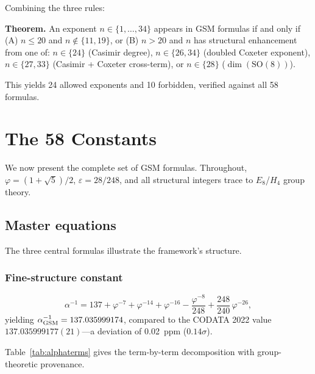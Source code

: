 \documentclass[aps,prd,twocolumn,superscriptaddress,nofootinbib,showpacs]{revtex4-2}
\begin{document}
Combining the three rules:

\textbf{Theorem.} An exponent $n \in \{1,\ldots,34\}$ appears in GSM
formulas if and only if (A) $n \leq 20$ and $n \notin \{11, 19\}$, or
(B) $n > 20$ and $n$ has structural enhancement from one of:
$n \in \{24\}$ (Casimir degree), $n \in \{26, 34\}$ (doubled Coxeter
exponent), $n \in \{27, 33\}$ (Casimir + Coxeter cross-term), or
$n \in \{28\}$ ($\dim(\mathrm{SO}(8))$).

This yields 24 allowed exponents and 10 forbidden, verified against
all 58 formulas.

\section{The 58 Constants}\label{sec:constants}

We now present the complete set of GSM formulas.  Throughout,
$\varphi = (1+\sqrt{5})/2$, $\varepsilon = 28/248$, and all
structural integers trace to $E_8$/$H_4$ group theory.

\subsection{Master equations}\label{sec:master}

The three central formulas illustrate the framework's structure.

\subsubsection{Fine-structure constant}

\begin{equation}
\alpha^{-1} = 137 + \varphi^{-7} + \varphi^{-14} + \varphi^{-16}
- \frac{\varphi^{-8}}{248} + \frac{248}{240}\,\varphi^{-26},
\label{eq:alpha}
\end{equation}
yielding $\alpha^{-1}_{\rm GSM} = 137.035999174$, compared to the
CODATA 2022 value $137.035999177(21)$---a deviation of 0.02~ppm
($0.14\sigma$).

Table~\ref{tab:alphaterms} gives the term-by-term decomposition with
group-theoretic provenance.
\end{document}
